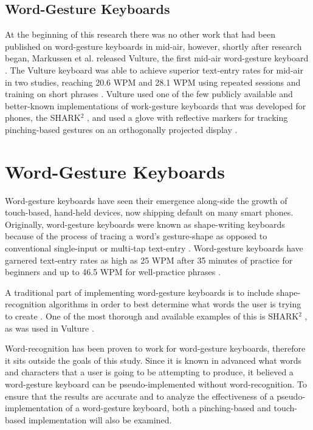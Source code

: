 \subsection{Word-Gesture Keyboards}
At the beginning of this research there was no other work that had been published on word-gesture keyboards in mid-air, however, shortly after research began, Markussen et al. released Vulture, the first mid-air word-gesture keyboard \cite{ref_vulture}. The Vulture keyboard was able to achieve superior text-entry rates for mid-air in two studies, reaching 20.6 WPM and 28.1 WPM using repeated sessions and training on short phrases \cite{ref_vulture}. Vulture used one of the few publicly available and better-known implementations of work-gesture keyboards that was developed for phones, the SHARK$^2$ \cite{ref_shape_writing,ref_shark_wgk}, and used a glove with reflective markers for tracking pinching-based gestures on an orthogonally projected display \cite{ref_selection_based_mid_air}.

\section{Word-Gesture Keyboards}
Word-gesture keyboards have seen their emergence along-side the growth of touch-based, hand-held devices, now shipping default on many smart phones. Originally, word-gesture keyboards were known as shape-writing keyboards because of the process of tracing a word's gesture-shape as opposed to conventional single-input or multi-tap text-entry \cite{ref_shape_writing,ref_the_word_gesture_keyboard,ref_shapewriter_iphone,ref_shark_wgk,ref_shorthand_writing}. Word-gesture keyboards have garnered text-entry rates as high as 25 WPM after 35 minutes of practice for beginners and up to 46.5 WPM for well-practice phrases \cite{ref_shape_writing}.

A traditional part of implementing word-gesture keyboards is to include shape-recognition algorithms in order to best determine what words the user is trying to create \cite{ref_shape_writing,ref_the_word_gesture_keyboard,ref_shapewriter_iphone,ref_shark_wgk,ref_shorthand_writing}. One of the most thorough and available examples of this is SHARK$^2$ \cite{ref_shape_writing,ref_shark_wgk}, as was used in Vulture \cite{ref_vulture}.

Word-recognition has been proven to work for word-gesture keyboards, therefore it sits outside the goals of this study. Since it is known in advanced what words and characters that a user is going to be attempting to produce, it believed a word-gesture keyboard can be pseudo-implemented without word-recognition. To ensure that the results are accurate and to analyze the effectiveness of a pseudo-implementation of a word-gesture keyboard, both a pinching-based and touch-based implementation will also be examined.

